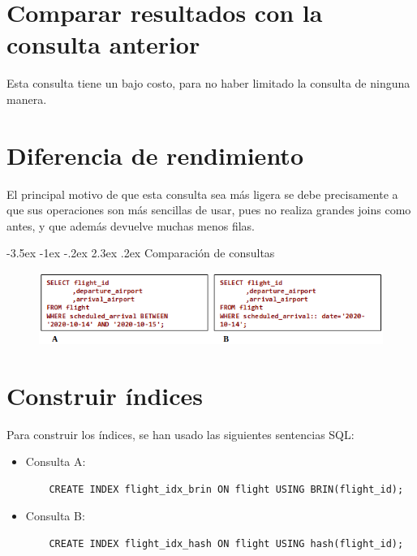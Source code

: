 \documentclass[11pt]{report}
\makeatletter
\renewcommand\chapter{\@startsection{chapter}{0}{\z@}%
    {-3.5ex \@plus -1ex \@minus -.2ex}%
    {2.3ex \@plus.2ex}%
    {\normalfont\Large\bfseries}}
\makeatother
\begin{document}
\section{Comparar resultados con la consulta anterior}
Esta consulta tiene un bajo costo, para no haber limitado la consulta de ninguna manera.

\section{Diferencia de rendimiento}
El principal motivo de que esta consulta sea más ligera se debe precisamente a que sus
operaciones son más sencillas de usar, pues no realiza grandes joins como antes, y que
además devuelve muchas menos filas.

\cleardoublepage

\chapter{Comparación de consultas}
\begin{figure}[H]
  \centering
  \includegraphics[scale=0.65]{img/comparacion_rendimiento.png}
  \label{fig:comparación de rendimiento}
\end{figure}

\section{Construir índices}
Para construir los índices, se han usado las siguientes sentencias SQL:
\begin{itemize}
  \item Consulta A:
  \begin{verbatim}
    CREATE INDEX flight_idx_brin ON flight USING BRIN(flight_id);
  \end{verbatim}
  \item Consulta B:
  \begin{verbatim}
    CREATE INDEX flight_idx_hash ON flight USING hash(flight_id);
  \end{verbatim}
\end{itemize}
\end{document}
